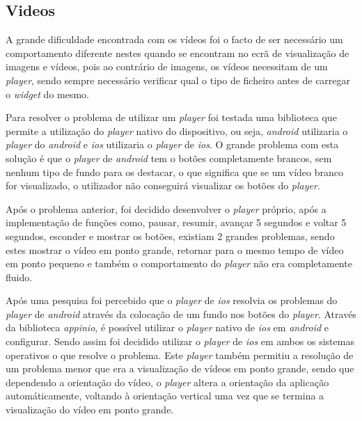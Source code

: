 \subsection{Videos}

A grande dificuldade encontrada com os vídeos foi o facto de ser necessário um comportamento diferente nestes quando se encontram no ecrã de visualização de imagens e vídeos, pois ao contrário de imagens, os vídeos necessitam de um \textit{player}, sendo sempre necessário verificar qual o tipo de ficheiro antes de carregar o \textit{widget} do mesmo.

Para resolver o problema de utilizar um \textit{player} foi testada uma biblioteca que permite a utilização do \textit{player} nativo do dispositivo, ou seja, \textit{android} utilizaria o \textit{player} do \textit{android} e \textit{ios} utilizaria o \textit{player} de \textit{ios}. O grande problema com esta solução é que o \textit{player} de \textit{android} tem o botões completamente brancos, sem nenhum tipo de fundo para os destacar, o que significa que se um vídeo branco for visualizado, o utilizador não conseguirá visualizar os botões do \textit{player}.

Após o problema anterior, foi decidido desenvolver o \textit{player} próprio, após a implementação de funções como, pausar, resumir, avançar 5 segundos e voltar 5 segundos, esconder e mostrar os botões, existiam 2 grandes problemas, sendo estes mostrar o vídeo em ponto grande, retornar para o mesmo tempo de vídeo em ponto pequeno e também o comportamento do \textit{player} não era completamente fluido.

Após uma pesquisa foi percebido que o \textit{player} de \textit{ios} resolvia os problemas do \textit{player} de \textit{android} através da colocação de um fundo nos botões do \textit{player}. Através da biblioteca \textit{appinio}, é possível utilizar o \textit{player} nativo de \textit{ios} em \textit{android} e configurar. Sendo assim foi decidido utilizar o \textit{player} de \textit{ios} em ambos os sistemas operativos o que resolve o problema. Este \textit{player} também permitiu a resolução de um problema menor que era a visualização de vídeos em ponto grande, sendo que dependendo a orientação do vídeo, o \textit{player} altera a orientação da aplicação automáticamente, voltando à orientação vertical uma vez que se termina a visualização do vídeo em ponto grande.